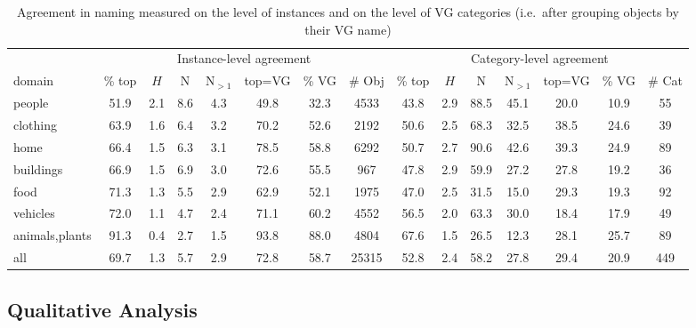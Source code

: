 \begin{table}
\small
\begin{tabular}{p{1.3cm}ccccccc|ccccccc}
\toprule
 & \multicolumn{7}{c|}{Instance-level agreement} & \multicolumn{7}{c}{Category-level agreement}\\ 
           domain & \% top &    $H$ &    N & N$_{>1}$ & top=VG &  \% VG &      \# Obj & \% top &    $H$ &     N & N$_{>1}$ & top=VG &  \% VG &  \# Cat\\
\midrule
         people &  51.9 &  2.1 &  8.6 &   4.3 &   49.8 &  32.3 &   4533 &  43.8 &  2.9 &  88.5 &  45.1 &   20.0 &  10.9 &   55 \\
         clothing &  63.9 &  1.6 &  6.4 &   3.2 &   70.2 &  52.6 &   2192 &  50.6 &  2.5 &  68.3 &  32.5 &   38.5 &  24.6 &   39 \\
           home &  66.4 &  1.5 &  6.3 &   3.1 &   78.5 &  58.8 &   6292 &  50.7 &  2.7 &  90.6 &  42.6 &   39.3 &  24.9 &   89 \\
      buildings &  66.9 &  1.5 &  6.9 &   3.0 &   72.6 &  55.5 &    967 &  47.8 &  2.9 &  59.9 &  27.2 &   27.8 &  19.2 &   36 \\       
                  food &  71.3 &  1.3 &  5.5 &   2.9 &   62.9 &  52.1 &   1975 &  47.0 &  2.5 &  31.5 &  15.0 &   29.3 &  19.3 &   92 \\
              vehicles &  72.0 &  1.1 &  4.7 &   2.4 &   71.1 &  60.2 &   4552 &  56.5 &  2.0 &  63.3 &  30.0 &   18.4 &  17.9 &   49 \\
        animals,plants &  91.3 &  0.4 &  2.7 &   1.5 &   93.8 &  88.0 &   4804 &  67.6 &  1.5 &  26.5 &  12.3 &   28.1 &  25.7 &   89 \\
       \midrule
       all &  69.7 &  1.3 &  5.7 &   2.9 &   72.8 &  58.7 &  25315 &  52.8 &  2.4 &  58.2 &  27.8 &   29.4 &  20.9 &  449 \\

\bottomrule
\end{tabular}\caption{Agreement in naming measured on the level of instances and on the level of VG categories (i.e.\ after grouping objects by their VG name) }
\label{tab:agree}
\end{table}


\subsection{Qualitative Analysis}

